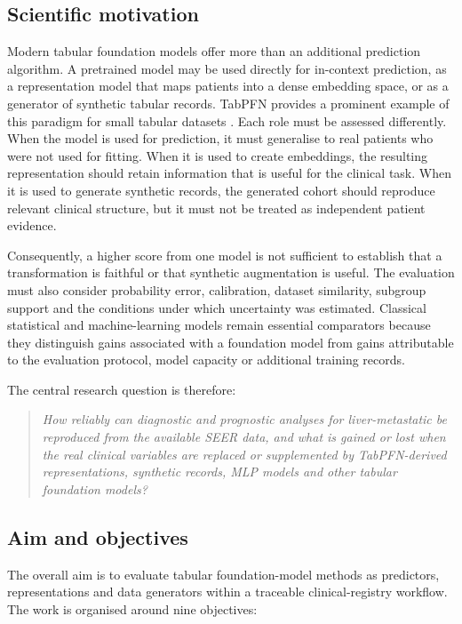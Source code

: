 \subsection{Scientific motivation}
\label{sec:introduction:motivation}

Modern tabular foundation models offer more than an additional prediction
algorithm. A pretrained model may be used directly for in-context prediction,
as a representation model that maps patients into a dense embedding space, or
as a generator of synthetic tabular records. TabPFN provides a prominent example
of this paradigm for small tabular datasets \citep{Hollmann2025}. Each role must
be assessed differently. When the model is used for prediction, it must
generalise to real patients who were not used for fitting. When it is used to
create embeddings, the resulting representation should retain information that
is useful for the clinical task. When it is used to generate synthetic records,
the generated cohort should reproduce relevant clinical structure, but it must
not be treated as independent patient evidence.

Consequently, a higher score from one model is not sufficient to establish that
a transformation is faithful or that synthetic augmentation is useful. The
evaluation must also consider probability error, calibration, dataset
similarity, subgroup support and the conditions under
which uncertainty was estimated. Classical statistical and machine-learning
models remain essential comparators because they distinguish gains associated
with a foundation model from gains attributable to the evaluation protocol,
model capacity or additional training records.

The central research question is therefore:
\begin{quote}
\itshape
How reliably can diagnostic and prognostic analyses for liver-metastatic
\pNET{} be reproduced from the available SEER data, and what is gained or lost
when the real clinical variables are replaced or supplemented by TabPFN-derived
representations, synthetic records, MLP models and other tabular
foundation models?
\end{quote}

\subsection{Aim and objectives}
\label{sec:introduction:objectives}

The overall aim is to evaluate tabular foundation-model methods as predictors,
representations and data generators within a traceable clinical-registry
workflow. The work is organised around nine objectives:

